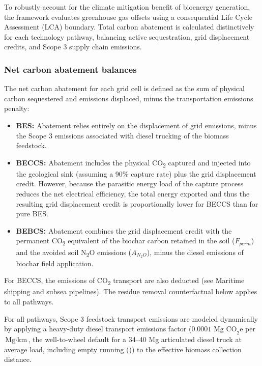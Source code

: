 \documentclass[
  letterpaper,
]{article}
\providecommand{\tightlist}{%
  \setlength{\itemsep}{0pt}\setlength{\parskip}{0pt}}\usepackage{longtable,booktabs,array}
\begin{document}
To robustly account for the climate mitigation benefit of bioenergy
generation, the framework evaluates greenhouse gas offsets using a
consequential Life Cycle Assessment (LCA) boundary. Total carbon
abatement is calculated distinctively for each technology pathway,
balancing active sequestration, grid displacement credits, and Scope 3
supply chain emissions.

\subsubsection{Net carbon abatement
balances}\label{net-carbon-abatement-balances}

The net carbon abatement for each grid cell is defined as the sum of
physical carbon sequestered and emissions displaced, minus the
transportation emissions penalty:

\begin{itemize}
\tightlist
\item
  \textbf{BES:} Abatement relies entirely on the displacement of grid
  emissions, minus the Scope 3 emissions associated with diesel trucking
  of the biomass feedstock.
\item
  \textbf{BECCS:} Abatement includes the physical CO\textsubscript{2}
  captured and injected into the geological sink (assuming a 90\%
  capture rate) plus the grid displacement credit. However, because the
  parasitic energy load of the capture process reduces the net
  electrical efficiency, the total energy exported and thus the
  resulting grid displacement credit is proportionally lower for BECCS
  than for pure BES.
\item
  \textbf{BEBCS:} Abatement combines the grid displacement credit with
  the permanent CO\textsubscript{2} equivalent of the biochar carbon
  retained in the soil (\(F_{perm}\)) and the avoided soil
  N\textsubscript{2}O emissions (\(A_{N_2O}\)), minus the diesel
  emissions of biochar field application.
\end{itemize}

For BECCS, the emissions of CO\textsubscript{2} transport are also
deducted (see Maritime shipping and subsea pipelines). The residue
removal counterfactual below applies to all pathways.

For all pathways, Scope 3 feedstock transport emissions are modeled
dynamically by applying a heavy-duty diesel transport emissions factor
(\(0.0001\text{ Mg CO}_2\text{e}\) per \(\text{Mg}\cdot\text{km}\), the
well-to-wheel default for a 34--40 Mg articulated diesel truck at
average load, including empty running
()) to the effective biomass
collection distance.
\end{document}
